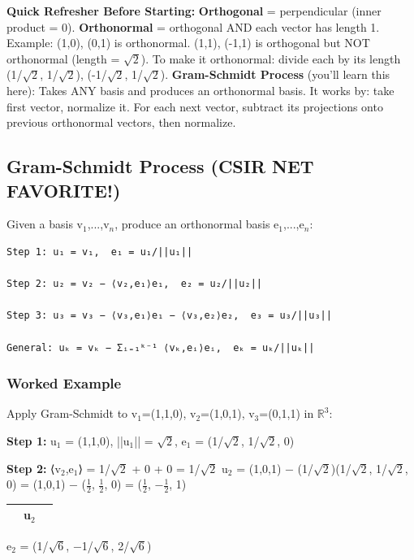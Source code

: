 \documentclass[12pt,a4paper,openany]{book}
\begin{document}
{{\begin{prereqbox}
 \textbf{Quick Refresher Before Starting:}
\textbf{Orthogonal} = perpendicular (inner product = 0).
\textbf{Orthonormal} = orthogonal AND each vector has length 1.
Example: {(1,0), (0,1)} is orthonormal. {(1,1), (-1,1)} is orthogonal but NOT orthonormal (length = $\sqrt{2}$).
To make it orthonormal: divide each by its length  {(1/$\sqrt{2}$, 1/$\sqrt{2}$), (-1/$\sqrt{2}$, 1/$\sqrt{2}$)}.
\textbf{Gram-Schmidt Process} (you'll learn this here): Takes ANY basis and produces an orthonormal basis.
It works by: take first vector, normalize it. For each next vector, subtract its projections onto previous orthonormal vectors, then normalize.
\end{prereqbox}


\subsection{Gram-Schmidt Process  (CSIR NET FAVORITE!)}

Given a basis {v$_1$,...,v$_n$}, produce an orthonormal basis {e$_1$,...,e$_n$}:

\begin{verbatim}
Step 1: u₁ = v₁,  e₁ = u₁/||u₁||

Step 2: u₂ = v₂ − ⟨v₂,e₁⟩e₁,  e₂ = u₂/||u₂||

Step 3: u₃ = v₃ − ⟨v₃,e₁⟩e₁ − ⟨v₃,e₂⟩e₂,  e₃ = u₃/||u₃||

General: uₖ = vₖ − Σᵢ₌₁ᵏ⁻¹ ⟨vₖ,eᵢ⟩eᵢ,  eₖ = uₖ/||uₖ||
\end{verbatim}

\subsubsection{Worked Example}
Apply Gram-Schmidt to {v$_1$=(1,1,0), v$_2$=(1,0,1), v$_3$=(0,1,1)} in $\mathbb{R}^3$:

\textbf{Step 1:}
u$_1$ = (1,1,0), ||u$_1$|| = $\sqrt{2}$, e$_1$ = (1/$\sqrt{2}$, 1/$\sqrt{2}$, 0)

\textbf{Step 2:}
⟨v$_2$,e$_1$⟩ = 1/$\sqrt{2}$ + 0 + 0 = 1/$\sqrt{2}$
u$_2$ = (1,0,1) − (1/$\sqrt{2}$)(1/$\sqrt{2}$, 1/$\sqrt{2}$, 0) = (1,0,1) − ($\frac{1}{2}$, $\frac{1}{2}$, 0) = ($\frac{1}{2}$, −$\frac{1}{2}$, 1)
\begin{center}
\begin{tabular}{|l|l|l|}
\hline
\textbf{} & \textbf{u$_2$} & \textbf{} \\
\hline
\end{tabular}
\end{center}
e$_2$ = (1/$\sqrt{6}$, −1/$\sqrt{6}$, 2/$\sqrt{6}$)

}}
\end{document}

